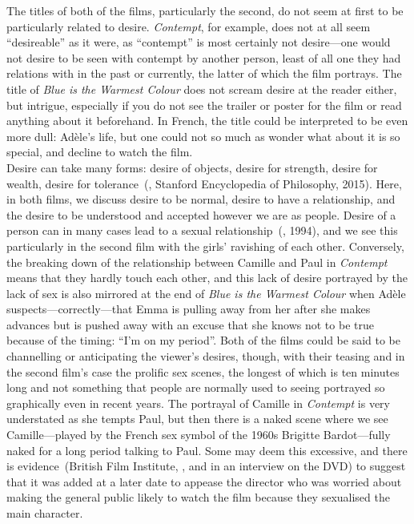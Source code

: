 \documentclass[12pt,a4paper]{article}
\begin{document}
The titles of both of the films, particularly the second, do not seem
at first to be particularly related to desire. \textit{Contempt}, for
example, does not at all seem ``desireable'' as it were, as
``contempt'' is most certainly not desire---one would not desire to be
seen with contempt by another person, least of all one they had
relations with in the past or currently, the latter of which the film
portrays. The title of \textit{Blue is the Warmest Colour} does not
scream desire at the reader either, but intrigue, especially if you do
not see the trailer or poster for the film or read anything about it
beforehand. In French, the title could be interpreted to be even more
dull: Adèle's life, but one could not so much as wonder what about it
is so special, and decline to watch the film.\\

Desire can take many forms: desire of objects, desire for strength,
desire for wealth, desire for tolerance~(\citeauthor{stanford-desire},
Stanford Encyclopedia of Philosophy, 2015). Here, in both films, we
discuss desire to be normal, desire to have a relationship, and the
desire to be understood and accepted however we are as people. Desire
of a person can in many cases lead to a sexual
relationship~(\citeauthor{desire-evolution}, 1994), and we see this
particularly in the second film with the girls' ravishing of each
other. Conversely, the breaking down of the relationship between
Camille and Paul in \textit{Contempt} means that they hardly touch
each other, and this lack of desire portrayed by the lack of sex is
also mirrored at the end of \textit{Blue is the Warmest Colour} when
Adèle suspects---correctly---that Emma is pulling away from her after
she makes advances but is pushed away with an excuse that she knows
not to be true because of the timing: ``I'm on my period''. Both of
the films could be said to be channelling or anticipating the viewer's
desires, though, with their teasing and in the second film's case the
prolific sex scenes, the longest of which is ten minutes long and not
something that people are normally used to seeing portrayed so
graphically even in recent years. The portrayal of Camille in
\textit{Contempt} is very understated as she tempts Paul, but then
there is a naked scene where we see Camille---played by the French sex
symbol of the 1960s Brigitte Bardot---fully naked for a long period
talking to Paul. Some may deem this excessive, and there is
evidence~(British Film Institute,
\citeyear{contempt-nakedness-addition}, and in an interview on the
DVD) to suggest that it was added at a later date to appease the
director who was worried about making the general public likely to
watch the film because they sexualised the main character.\\
\end{document}
